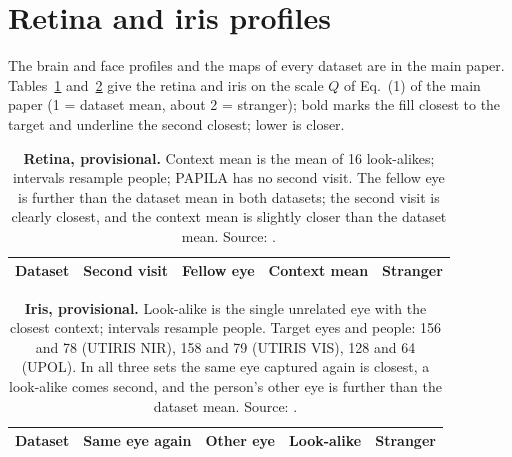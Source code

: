 \section{Retina and iris profiles}
\label{sec:s-profiles}
The brain and face profiles and the maps of every dataset are in the main paper.
Tables~\ref{tab:fundus} and~\ref{tab:iris} give the retina and iris on the scale $Q$ of Eq.~(1) of the main paper (1 = dataset mean, about 2 = stranger); bold marks the fill closest to the target and underline the second closest; lower is closer.

\begin{table}[htbp]
\centering
\caption{\textbf{Retina, provisional.}
Context mean is the mean of 16 look-alikes; intervals resample people; PAPILA has no second visit.
The fellow eye is further than the dataset mean in both datasets; the second visit is clearly closest, and the context mean is slightly closer than the dataset mean.
Source: .}
\label{tab:fundus}
\small
\begin{tabular}{@{}lcccc@{}}
\toprule
Dataset & Second visit & Fellow eye & Context mean & Stranger \\
\midrule

\end{tabular}
\end{table}

\begin{table}[htbp]
\centering
\caption{\textbf{Iris, provisional.}
Look-alike is the single unrelated eye with the closest context; intervals resample people.
Target eyes and people: 156 and 78 (UTIRIS \acs{NIR}), 158 and 79 (UTIRIS \acs{VIS}), 128 and 64 (UPOL).
In all three sets the same eye captured again is closest, a look-alike comes second, and the person's other eye is further than the dataset mean.
Source: .}
\label{tab:iris}
\small
\begin{tabular}{@{}lcccc@{}}
\toprule
Dataset & Same eye again & Other eye & Look-alike & Stranger \\
\midrule

\end{tabular}
\end{table}
